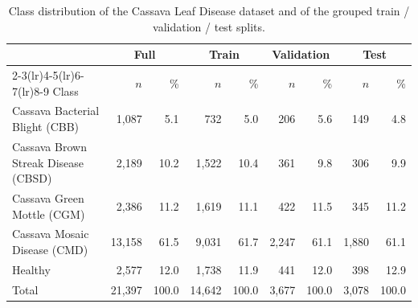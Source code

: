 \begin{table}[t]
\centering
\caption{Class distribution of the Cassava Leaf Disease dataset and of the grouped train / validation / test splits.}
\label{tab:class-distribution}
\begin{tabular}{lrrrrrrrr}
\toprule
 & \multicolumn{2}{c}{Full} & \multicolumn{2}{c}{Train} & \multicolumn{2}{c}{Validation} & \multicolumn{2}{c}{Test} \\
\cmidrule(lr){2-3}\cmidrule(lr){4-5}\cmidrule(lr){6-7}\cmidrule(lr){8-9}
Class & $n$ & \% & $n$ & \% & $n$ & \% & $n$ & \% \\
\midrule
Cassava Bacterial Blight (CBB) & 1,087 & 5.1 & 732 & 5.0 & 206 & 5.6 & 149 & 4.8 \\
Cassava Brown Streak Disease (CBSD) & 2,189 & 10.2 & 1,522 & 10.4 & 361 & 9.8 & 306 & 9.9 \\
Cassava Green Mottle (CGM) & 2,386 & 11.2 & 1,619 & 11.1 & 422 & 11.5 & 345 & 11.2 \\
Cassava Mosaic Disease (CMD) & 13,158 & 61.5 & 9,031 & 61.7 & 2,247 & 61.1 & 1,880 & 61.1 \\
Healthy & 2,577 & 12.0 & 1,738 & 11.9 & 441 & 12.0 & 398 & 12.9 \\
\midrule
Total & 21,397 & 100.0 & 14,642 & 100.0 & 3,677 & 100.0 & 3,078 & 100.0 \\
\bottomrule
\end{tabular}
\end{table}
